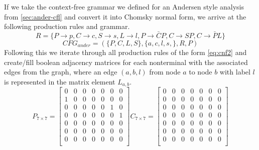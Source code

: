 If we take the context-free grammar we defined for an Andersen style analysis from \autoref{sec:ander-cfl} and convert it into Chomsky normal form, we arrive at the following production rules and grammar.
$$R=\{P\rightarrow p, C \rightarrow c, S\rightarrow s, L\rightarrow l, P\rightarrow \bar{C}P, C\rightarrow SP, C\rightarrow \bar{P}L\}$$
$$CFG_{ander}=(\{P,C,L,S\}, \{a,c,l,s,\}, R, P)$$
Following this we iterate through all production rules of the form \autoref{eq:cnf2} and create/fill boolean adjacency matrices for each nonterminal with the associated edges from the graph, where an edge $(a,b,l)$ from node $a$ to node $b$ with label $l$ is represented in the matrix element $L_{a,b}$.
\[
    P_{7\times 7} = 
    \begin{bmatrix}
        0 & 0 & 0 & 0 & 0 & 0 & 0 \\
        1 & 0 & 0 & 0 & 0 & 0 & 0 \\
        0 & 0 & 0 & 0 & 0 & 1 & 0 \\
        0 & 0 & 0 & 0 & 0 & 0 & 1 \\
        0 & 0 & 0 & 0 & 0 & 0 & 0 \\
        0 & 0 & 0 & 0 & 0 & 0 & 0 \\
        0 & 0 & 0 & 0 & 0 & 0 & 0 \\
    \end{bmatrix}
    C_{7\times 7} = 
    \begin{bmatrix}
        0 & 0 & 0 & 0 & 0 & 0 & 0 \\
        0 & 0 & 0 & 0 & 0 & 0 & 0 \\
        0 & 0 & 0 & 0 & 0 & 0 & 0 \\
        0 & 0 & 0 & 0 & 0 & 0 & 0 \\
        0 & 0 & 0 & 0 & 0 & 0 & 0 \\
        0 & 0 & 0 & 0 & 0 & 0 & 0 \\
        0 & 0 & 0 & 0 & 0 & 0 & 0 \\
    \end{bmatrix}
\]
